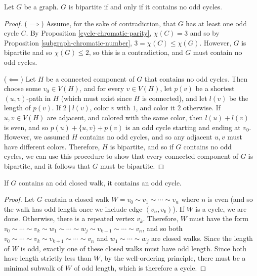 \begin{thm}
    Let $G$ be a graph. $G$ is bipartite if and only if it contains no odd cycles.
\end{thm}

\begin{proof}\proofbreak
    ($\implies$) Assume, for the sake of contradiction, that $G$ has at least one odd cycle $C$. By Proposition \ref{cycle-chromatic-parity}, $\chi(C) = 3$ and so by Proposition \ref{subgraph-chromatic-number}, $3 = \chi(C) \leq \chi(G)$. However, $G$ is bipartite and so $\chi(G) \leq 2$, so this is a contradiction, and $G$ must contain no odd cycles.

    ($\impliedby$) Let $H$ be a connected component of $G$ that contains no odd cycles. Then choose some $v_0 \in V(H)$, and for every $v \in V(H)$, let $p(v)$ be a shortest $(u,v)$-path in $H$ (which must exist since $H$ is connected), and let $l(v)$ be the length of $p(v)$. If $2 \mid l(v)$, color $v$ with $1$, and color it $2$ otherwise. If $u, v \in V(H)$ are adjacent, and colored with the same color, then $l(u) + l(v)$ is even, and so $p(u) + \{u, v\} + p(v)$ is an odd cycle starting and ending at $v_0$. However, we assumed $H$ contains no odd cycles, and so any adjacent $u,v$ must have different colors. Therefore, $H$ is bipartite, and so if $G$ contains no odd cycles, we can use this procedure to show that every connected component of $G$ is bipartite, and it follows that $G$ must be bipartite.
\end{proof}

\begin{prop}
    If $G$ contains an odd closed walk, it contains an odd cycle.
\end{prop}

\begin{proof}
    Let $G$ contain a closed walk $W = v_0 \sim v_1 \sim \cdots \sim v_n$ where $n$ is even (and so the walk has odd length once we include edge $(v_n, v_0)$). If $W$ is a cycle, we are done. Otherwise, there is a repeated vertex $v_k$. Therefore, $W$ must have the form $v_0 \sim \cdots \sim v_k \sim w_1 \sim \cdots \sim w_j \sim v_{k+1} \sim \cdots \sim v_n$, and so both $v_0 \sim \cdots \sim v_k \sim v_{k+1} \sim \cdots \sim v_n$ and $w_1 \sim \cdots \sim w_j$ are closed walks. Since the length of $W$ is odd, exactly one of these closed walks must have odd length. Since both have length strictly less than $W$, by the well-ordering principle, there must be a minimal subwalk of $W$ of odd length, which is therefore a cycle.
\end{proof}

